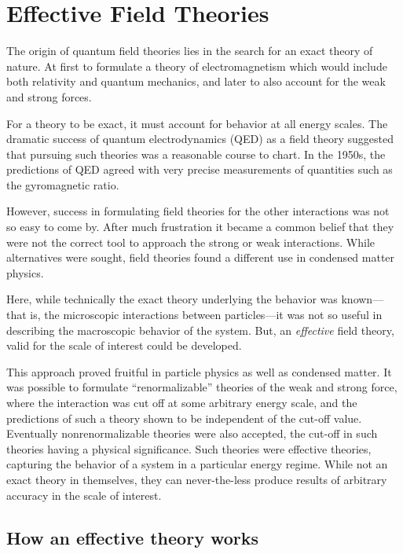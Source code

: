 

\section{Effective Field Theories}

The origin of quantum field theories lies in the search for an exact theory of nature.  At first to formulate a theory of electromagnetism which would include both relativity and quantum mechanics, and later to also account for the weak and strong forces.

For a theory to be exact, it must account for behavior at all energy scales.  The dramatic success of quantum electrodynamics (QED) as a field theory suggested that pursuing such theories was a reasonable course to chart.  In the 1950s, the predictions of QED agreed with very precise measurements of quantities such as the gyromagnetic ratio.  

However, success in formulating field theories for the other interactions was not so easy to come by.  After much frustration it became a common belief that they were not the correct tool to approach the strong or weak interactions.  While alternatives were sought, field theories found a different use in condensed matter physics.  

Here, while technically the exact theory underlying the behavior was known---that is, the microscopic interactions between particles---it was not so useful in describing the macroscopic behavior of the system.  But, an {\it effective} field theory, valid for the scale of interest could be developed. 

This approach proved fruitful in particle physics as well as condensed matter.  It was possible to formulate ``renormalizable'' theories of the weak and strong force, where the interaction was cut off at some arbitrary energy scale, and the predictions of such a theory shown to be independent of the cut-off value.  Eventually nonrenormalizable theories were also accepted, the cut-off in such theories having a physical significance.  Such theories were effective theories, capturing the behavior of a system in a particular energy regime.  While not an exact theory in themselves, they can never-the-less produce results of arbitrary accuracy in the scale of interest.

\subsection{How an effective theory works}

